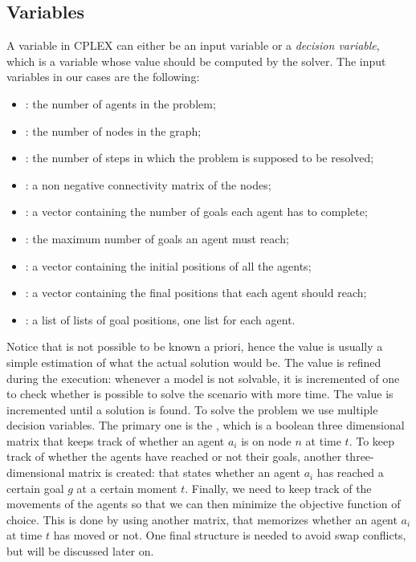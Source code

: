 \subsection{Variables}
A variable in CPLEX can either be an input variable or a \textit{decision
variable}, which is a variable whose value should be computed by the solver.
\newline
The input variables in our cases are the following: 
\begin{itemize}
  \item {}: the number of agents in the problem;
  \item {}: the number of nodes in the graph;
  \item {}: the number of steps in which the problem is supposed to
    be resolved;
  \item {}: a non negative connectivity matrix of
    the nodes;
  \item {}: a vector containing the number of goals each
    agent has to complete;
  \item {}: the maximum number of goals an agent must reach;
  \item {}: a vector containing the initial positions of
    all the agents;
  \item {}: a vector containing the final positions that
    each agent should reach;
  \item {}: a list of lists of goal
    positions, one list for each agent. 
\end{itemize}
Notice that  is not possible to be known a priori, hence the
value is usually a simple estimation of what the actual solution would be. The
value is refined during the execution: whenever a model is not solvable, it is
incremented of one to check whether is possible to solve the scenario with more
time. The value is incremented until a solution is found. \newline
To solve the  problem we use multiple decision variables. The
primary one is the , which is a boolean
three dimensional matrix that keeps track of whether an agent $a_i$ is on node
$n$ at time $t$. \newline
To keep track of whether the agents have reached or not their goals, another
three-dimensional matrix is created:
 that states whether an agent
$a_i$ has reached a certain goal $g$ at a certain moment $t$. \newline
Finally, we need to keep track of the movements of the agents so that we can
then minimize the objective function of choice. This is done by using another
matrix,  that memorizes whether an agent
$a_i$ at time $t$ has moved or not. \newline
One final structure is needed to avoid swap conflicts, but will be discussed
later on.
%
%
